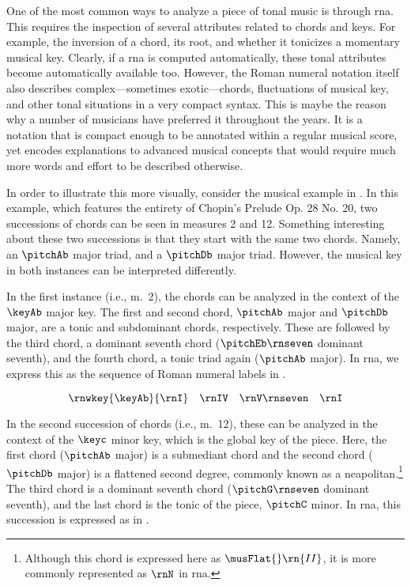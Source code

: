 
One of the most common ways to analyze a piece of tonal
music is through \gls{rna}. This requires the inspection of
several attributes related to chords and keys. For example,
the inversion of a chord, its root, and whether it tonicizes
a momentary musical key. Clearly, if a \gls{rna} is computed
automatically, these tonal attributes become automatically
available too. However, the Roman numeral notation itself
also describes complex---sometimes exotic---chords,
fluctuations of musical key, and other tonal situations in a
very compact syntax. This is maybe the reason why a number
of musicians have preferred it throughout the years. It is a
notation that is compact enough to be annotated within a
regular musical score, yet encodes explanations to advanced
musical concepts that would require much more words and
effort to be described otherwise.

In order to illustrate this more visually, consider the
musical example in . In this
example, which features the entirety of Chopin's Prelude Op.
28 No. 20, two successions of chords can be seen in measures
2 and 12. Something interesting about these two successions
is that they start with the same two chords. Namely, an
$\pitchAb$ major triad, and a $\pitchDb$ major triad.
However, the musical key in both instances can be
interpreted differently.


In the first instance (i.e., m.~2), the chords can be
analyzed in the context of the $\keyAb$ major key. The first
and second chord, $\pitchAb$ major and $\pitchDb$ major, are
a tonic and subdominant chords, respectively. These are
followed by the third chord, a dominant seventh chord
($\pitchEb\rnseven$ dominant seventh), and the fourth chord,
a tonic triad again ($\pitchAb$ major). In \gls{rna}, we
express this as the sequence of Roman numeral labels in
.

\begin{equation}
    \label{eq:succession1}
    \rnwkey{\keyAb}{\rnI} \quad \rnIV \quad \rnV\rnseven \quad \rnI
\end{equation}

In the second succession of chords (i.e., m.~12), these can
be analyzed in the context of the $\keyc$ minor key, which
is the global key of the piece. Here, the first chord
($\pitchAb$ major) is a submediant chord and the second
chord ($\pitchDb$ major) is a flattened second degree,
commonly known as a \gls{neapolitan}.\footnote{Although this
chord is expressed here as $\musFlat{}\rn{II}$, it is more
commonly represented as $\rnN$ in \gls{rna}.} The third
chord is a dominant seventh chord ($\pitchG\rnseven$
dominant seventh), and the last chord is the tonic of the
piece, $\pitchC$ minor. In \gls{rna}, this succession is
expressed as in .

